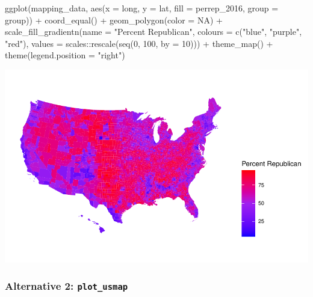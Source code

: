 \documentclass[
  letterpaper,
  DIV=11,
  numbers=noendperiod]{scrreprt}
\newenvironment{Shaded}{\begin{snugshade}}{\end{snugshade}}
\newcommand{\AttributeTok}[1]{\textcolor[rgb]{0.40,0.45,0.13}{#1}}
\newcommand{\ConstantTok}[1]{\textcolor[rgb]{0.56,0.35,0.01}{#1}}
\newcommand{\DecValTok}[1]{\textcolor[rgb]{0.68,0.00,0.00}{#1}}
\newcommand{\FunctionTok}[1]{\textcolor[rgb]{0.28,0.35,0.67}{#1}}
\newcommand{\NormalTok}[1]{\textcolor[rgb]{0.00,0.23,0.31}{#1}}
\newcommand{\SpecialCharTok}[1]{\textcolor[rgb]{0.37,0.37,0.37}{#1}}
\newcommand{\StringTok}[1]{\textcolor[rgb]{0.13,0.47,0.30}{#1}}
\begin{document}
\begin{Shaded}
\begin{Highlighting}[]
\FunctionTok{ggplot}\NormalTok{(mapping\_data, }\FunctionTok{aes}\NormalTok{(}\AttributeTok{x =}\NormalTok{ long, }\AttributeTok{y =}\NormalTok{ lat, }\AttributeTok{fill =}\NormalTok{ perrep\_2016, }\AttributeTok{group =}\NormalTok{ group)) }\SpecialCharTok{+}
  \FunctionTok{coord\_equal}\NormalTok{() }\SpecialCharTok{+}
  \FunctionTok{geom\_polygon}\NormalTok{(}\AttributeTok{color =} \ConstantTok{NA}\NormalTok{) }\SpecialCharTok{+}
  \FunctionTok{scale\_fill\_gradientn}\NormalTok{(}\AttributeTok{name =} \StringTok{"Percent Republican"}\NormalTok{, }\AttributeTok{colours =} \FunctionTok{c}\NormalTok{(}\StringTok{"blue"}\NormalTok{, }\StringTok{"purple"}\NormalTok{, }\StringTok{"red"}\NormalTok{), }\AttributeTok{values =}\NormalTok{ scales}\SpecialCharTok{::}\FunctionTok{rescale}\NormalTok{(}\FunctionTok{seq}\NormalTok{(}\DecValTok{0}\NormalTok{, }\DecValTok{100}\NormalTok{, }\AttributeTok{by =} \DecValTok{10}\NormalTok{))) }\SpecialCharTok{+}
  \FunctionTok{theme\_map}\NormalTok{() }\SpecialCharTok{+}
  \FunctionTok{theme}\NormalTok{(}\AttributeTok{legend.position =} \StringTok{"right"}\NormalTok{)}
\end{Highlighting}
\end{Shaded}

\includegraphics{src/06-Spatial_Viz_files/figure-pdf/unnamed-chunk-17-1.pdf}

\subsubsection*{\texorpdfstring{Alternative 2:
\texttt{plot\_usmap}}{Alternative 2: plot\_usmap}}\label{alternative-2-plot_usmap}
\end{document}
